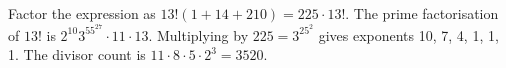Factor the expression as $ 13!(1+14+210)=225\cdot13!$. The prime factorisation of $ 13!$ is $ 2^{10}3^55^27\cdot11\cdot13 $. Multiplying by $ 225=3^25^2 $ gives exponents 10, 7, 4, 1, 1, 1. The divisor count is $\boxed{11\cdot8\cdot5\cdot2^3=3520}$.
